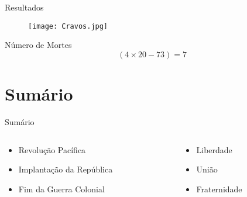 \documentclass{beamer}
\begin{document}
\begin{frame}{Resultados}
\begin{figure}
  \texttt{[image: Cravos.jpg]}
\end{figure}
\begin{block}{Número de Mortes}
\begin{equation}
  (4 \times 20 - 73) = 7
\end{equation}
\end{block}
\end{frame}

\section{Sumário}

\begin{frame}{Sumário}
\begin{columns}
\begin{column}{0.6\textwidth}
\begin{itemize}
  \item Revolução Pacífica
  \item Implantação da República
  \item Fim da Guerra Colonial
\end{itemize}
\end{column}
\begin{column}{0.4\textwidth}
\begin{itemize}
  \item Liberdade
  \item União
  \item Fraternidade
\end{itemize}
\end{column}
\end{columns}

\end{frame}
\end{document}
